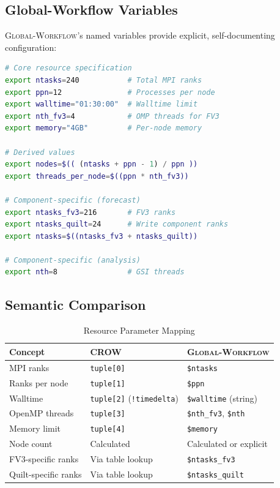 \documentclass[11pt,twoside]{article}
\newcommand{\crow}{\textsc{CROW}}
\newcommand{\gw}{\textsc{Global-Workflow}}
\begin{document}
\subsection{Global-Workflow Variables}

\gw{}'s named variables provide explicit, self-documenting configuration:

\begin{lstlisting}[language=Bash, caption={\gw{} Resource Variables}]
# Core resource specification
export ntasks=240           # Total MPI ranks
export ppn=12               # Processes per node  
export walltime="01:30:00"  # Walltime limit
export nth_fv3=4            # OMP threads for FV3
export memory="4GB"         # Per-node memory

# Derived values
export nodes=$(( (ntasks + ppn - 1) / ppn ))
export threads_per_node=$((ppn * nth_fv3))

# Component-specific (forecast)
export ntasks_fv3=216       # FV3 ranks
export ntasks_quilt=24      # Write component ranks
export ntasks=$((ntasks_fv3 + ntasks_quilt))

# Component-specific (analysis)
export nth=8                # GSI threads
\end{lstlisting}

\subsection{Semantic Comparison}

\begin{table}[H]
\centering
\caption{Resource Parameter Mapping}
\label{tab:param-mapping}
\begin{tabular}{@{}lll@{}}
\toprule
\textbf{Concept} & \textbf{\crow{}} & \textbf{\gw{}} \\
\midrule
MPI ranks & \texttt{tuple[0]} & \texttt{\$ntasks} \\
Ranks per node & \texttt{tuple[1]} & \texttt{\$ppn} \\
Walltime & \texttt{tuple[2]} (\texttt{!timedelta}) & \texttt{\$walltime} (string) \\
OpenMP threads & \texttt{tuple[3]} & \texttt{\$nth\_fv3}, \texttt{\$nth} \\
Memory limit & \texttt{tuple[4]} & \texttt{\$memory} \\
Node count & Calculated & Calculated or explicit \\
FV3-specific ranks & Via table lookup & \texttt{\$ntasks\_fv3} \\
Quilt-specific ranks & Via table lookup & \texttt{\$ntasks\_quilt} \\
\bottomrule
\end{tabular}
\end{table}
\end{document}
